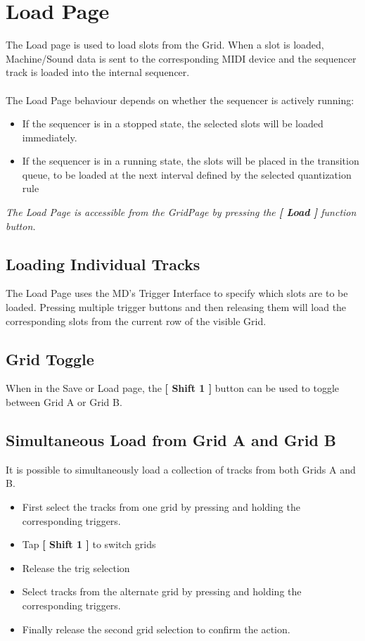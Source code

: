 \chapter{Load Page}
The Load page is used to load slots from the Grid. When a slot is loaded, Machine/Sound data is sent to the corresponding MIDI device and the sequencer track is loaded into the internal sequencer.\\
\\
The Load Page behaviour depends on whether the sequencer is actively running:
\begin{itemize}
    \item If the sequencer is in a stopped state, the selected slots will be loaded immediately.
    \item If the sequencer is in a running state, the slots will be placed in the transition queue, to be loaded at the next interval defined by the selected quantization rule
\end{itemize}
\textit{The Load Page is accessible from the GridPage by pressing the  \textbf{[ Load ]} function button.}

\section{Loading Individual Tracks}
The Load Page uses the MD's Trigger Interface to specify which slots are to be loaded. Pressing multiple trigger buttons and then releasing them will load the corresponding slots from the current row of the visible Grid.
\section{Grid Toggle}
When in the Save or Load page, the \textbf{[ Shift 1 ]} button can be used to toggle between Grid A or Grid B.
\newpage
\section{Simultaneous Load from Grid A and Grid B}
It is possible to simultaneously load a collection of tracks from both Grids A and B. 
\begin{itemize}
\item First select the tracks from one grid by pressing and holding the corresponding triggers.
\item Tap \textbf{[ Shift 1 ]} to switch grids
\item Release the trig selection
\item Select tracks from the alternate grid by pressing and holding the corresponding triggers. 
\item Finally release the second grid selection to confirm the action. 
\end{itemize}

